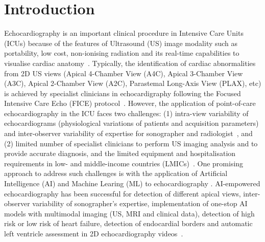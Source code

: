 \documentclass[mlabstract,twocolumn]{jmlr}
\begin{document}
\section{Introduction}
\label{sec:intro}
Echocardiography is an important clinical procedure in Intensive Care Units (ICUs) because of the features of Ultrasound (US) image modality such as portability, low cost, non-ionising radiation and its real-time capabilities to visualise cardiac anatomy~\citep{Feigenbaum1996, Vieillard-Baron2008, singh2007, cambell2018}.
Typically, the identification of cardiac abnormalities from 2D US views (Apical 4-Chamber View (A4C), Apical 3-Chamber View (A3C), Apical 2-Chamber View (A2C), Parastemal Long-Axis View (PLAX), etc) is achieved by specialist clinicians in echocardigraphy following the Focused Intensive Care Echo (FICE) protocol~\citep{2017_hall_JIntensiveCareSociety}. %
However, the application of point-of-care echocardiography in the ICU faces two challenges:
(1) intra-view variability of echocardiograms (physiological variations of patients and acquisition parameters) and inter-observer variability of expertise for sonographer and radiologist~\citep{khamis2017, Feigenbaum1996, field2011}, and
(2) limited number of specialist clinicians to perform US imaging analysis and to provide accurate diagnosis, and the limited equipment and hospitalisation requirements in low- and middle-income countries (LMICs)~\citep{hao2021-wellcome, 2021-huyNhat-vanHao-in-FAIR-MICCAI, 2016_becker_in_TropicalMedicineInternationalHealth}.
One promising approach to address such challenges is with the application of Artificial Intelligence (AI) and Machine Learing (ML) to echocardiography \citep{2022ASCH_JAmericanSocietyEchocardiography}.
AI-empowered echocardiography has been successful for detection of different apical views, inter-observer variability of sonographer's expertise, implementation of one-stop AI models with multimodal imaging (US, MRI and clinical data), detection of high risk or low risk of heart failure, detection of endocardial borders and automatic left ventricle assessment in 2D echocardiography videos~\citep{tromp2022, zhang2022-mdpi, behnami2020, ono2022}.
\end{document}
